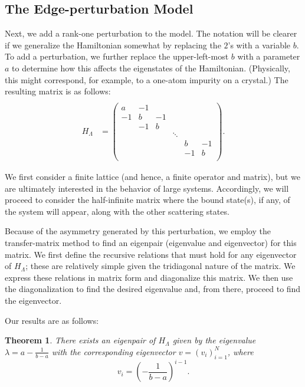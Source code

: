 \documentclass{article}
\newtheorem{theorem}{Theorem}
\newcommand{\hl}{H_\Lambda}
\numberwithin{equation}{section}
\numberwithin{theorem}{section}
\numberwithin{proposition}{section}
\numberwithin{lemma}{section}
\numberwithin{corollary}{section}
\numberwithin{definition}{section}
\begin{document}
\subsection{The Edge-perturbation Model}

Next, we add a rank-one perturbation to the model. The notation will be clearer if we generalize the Hamiltonian somewhat by replacing the $2$'s with a variable $b$. To add a perturbation, we further replace the upper-left-most $b$ with a parameter $a$ to determine how this affects the eigenstates of the Hamiltonian. (Physically, this might correspond, for example, to a one-atom impurity on a crystal.) The resulting matrix is as follows:
	\begin{align*}
	\\ \hl &= \left(
		\begin{array}{cccccc}
			a & -1 &  &  &  &  \\
			-1 & b & -1 &  &  &  \\
			 & -1 & b &  &  &  \\
			 &  &  & \ddots &  &  \\
			 &  &  &  & b & -1 \\
			 &  &  &  & -1 & b \\
		\end{array}
	\right).
	\end{align*}

We first consider a finite lattice (and hence, a finite operator and matrix), but we are ultimately interested in the behavior of large systems. Accordingly, we will proceed to consider the half-infinite matrix where the bound state(s), if any, of the system will appear, along with the other scattering states.

Because of the asymmetry generated by this perturbation, we employ the transfer-matrix method to find an eigenpair (eigenvalue and eigenvector) for this matrix. We first define the recursive relations that must hold for any eigenvector of $\hl$; these are relatively simple given the tridiagonal nature of the matrix. We express these relations in matrix form and diagonalize this matrix. We then use the diagonalization to find the desired eigenvalue and, from there, proceed to find the eigenvector.



Our results are as follows:

\begin{theorem}
There exists an eigenpair of $\hl$ given by the eigenvalue $\lambda = a - \frac{1}{b-a}$ with the corresponding eigenvector $v = (v_i)_{i=1}^N$, where
\begin{equation}
v_i = \left( - \frac{1}{b-a} \right) ^ {i-1}.
\end{equation}
\end{theorem}
\end{document}
